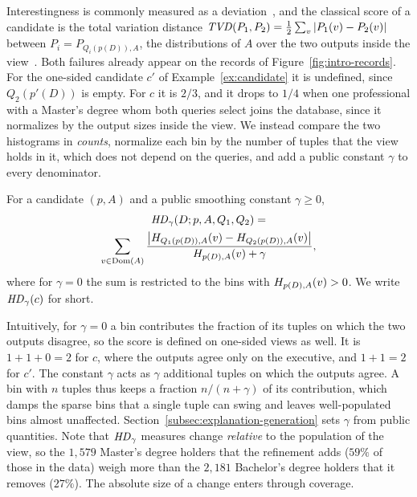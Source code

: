 Interestingness is commonly measured as a deviation~\cite{SilberschatzT96,GengHamilton06,TanKS02,Sarawagi98}, and the classical score of a candidate is the total variation distance $\mathit{TVD}(P_1, P_2) = \frac{1}{2}\sum_{v} |P_1(v) - P_2(v)|$ between $P_i = P_{Q_i(p(D)),A}$, the distributions of $A$ over the two outputs inside the view~\cite{SeeDB,FEDEX}.
Both failures already appear on the records of Figure~\ref{fig:intro-records}.
For the one-sided candidate $c'$ of Example~\ref{ex:candidate} it is undefined, since $Q_2(p'(D))$ is empty.
For $c$ it is $2/3$, and it drops to $1/4$ when one professional with a Master's degree whom both queries select joins the database, since it normalizes by the output sizes inside the view.
We instead compare the two histograms in \emph{counts}, normalize each bin by the number of tuples that the view holds in it, which does not depend on the queries, and add a public constant $\gamma$ to every denominator.

\begin{definition}
\label{def:hd}
For a candidate $(p,A)$ and a public smoothing constant $\gamma \ge 0$,
\begin{multline}
\mathit{HD}_\gamma(D;p,A,Q_1,Q_2) = \\
\sum_{v\in \operatorname{Dom}(A)}
\frac{\big|H_{Q_1(p(D)),A}(v)-H_{Q_2(p(D)),A}(v)\big|}
     {H_{p(D),A}(v)+\gamma} ,
\label{eq:hd-definition}
\end{multline}
where for $\gamma=0$ the sum is restricted to the bins with $H_{p(D),A}(v)>0$.
We write $\mathit{HD}_\gamma(c)$ for short.
\end{definition}

Intuitively, for $\gamma=0$ a bin contributes the fraction of its tuples on which the two outputs disagree, so the score is defined on one-sided views as well.
It is $1+1+0=2$ for $c$, where the outputs agree only on the executive, and $1+1=2$ for $c'$.
The constant $\gamma$ acts as $\gamma$ additional tuples on which the outputs agree.
A bin with $n$ tuples thus keeps a fraction $n/(n+\gamma)$ of its contribution, which damps the sparse bins that a single tuple can swing and leaves well-populated bins almost unaffected.
Section~\ref{subsec:explanation-generation} sets $\gamma$ from public quantities.
Note that $\mathit{HD}_\gamma$ measures change \emph{relative} to the population of the view, so the $1{,}579$ Master's degree holders that the refinement adds ($59\%$ of those in the data) weigh more than the $2{,}181$ Bachelor's degree holders that it removes ($27\%$).
The absolute size of a change enters through coverage.

